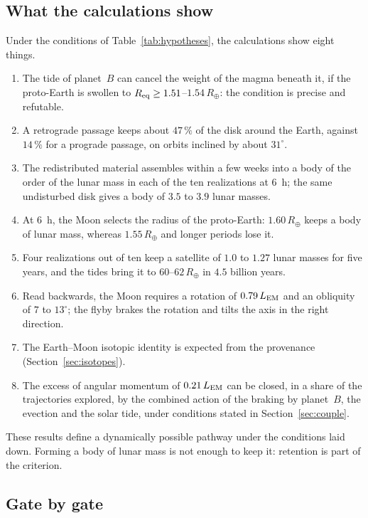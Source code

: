 \documentclass[11pt,a4paper]{article}
\newcommand{\Rt}{\ensuremath{R_\oplus}}
\newcommand{\LEM}{\ensuremath{L_{\rm EM}}}
\newcommand{\Req}{\ensuremath{R_{\rm eq}}}
\begin{document}
\subsection{What the calculations show}

Under the conditions of Table~\ref{tab:hypotheses}, the calculations show eight things.
\begin{enumerate}[leftmargin=1.6em,itemsep=2pt]
\item The tide of planet~$B$ can cancel the weight of the magma beneath it, if the proto-Earth is swollen to $\Req\ge1.51$--$1.54\,\Rt$: the condition is precise and refutable.
\item A retrograde passage keeps about $47\,\%$ of the disk around the Earth, against $14\,\%$ for a prograde passage, on orbits inclined by about $31^\circ$.
\item The redistributed material assembles within a few weeks into a body of the order of the lunar mass in each of the ten realizations at $6$~h; the same undisturbed disk gives a body of $3.5$ to $3.9$ lunar masses.
\item At $6$~h, the Moon selects the radius of the proto-Earth: $1.60\,\Rt$ keeps a body of lunar mass, whereas $1.55\,\Rt$ and longer periods lose it.
\item Four realizations out of ten keep a satellite of $1.0$ to $1.27$ lunar masses for five years, and the tides bring it to $60$--$62\,\Rt$ in $4.5$ billion years.
\item Read backwards, the Moon requires a rotation of $0.79\,\LEM$ and an obliquity of $7$ to $13^\circ$; the flyby brakes the rotation and tilts the axis in the right direction.
\item The Earth--Moon isotopic identity is expected from the provenance (Section~\ref{sec:isotopes}).
\item The excess of angular momentum of $0.21\,\LEM$ can be closed, in a share of the trajectories explored, by the combined action of the braking by planet~$B$, the evection and the solar tide, under conditions stated in Section~\ref{sec:couple}.
\end{enumerate}
These results define a dynamically possible pathway under the conditions laid down. Forming a body of lunar mass is not enough to keep it: retention is part of the criterion.

\subsection{Gate by gate}
\label{sec:portes}
\end{document}
